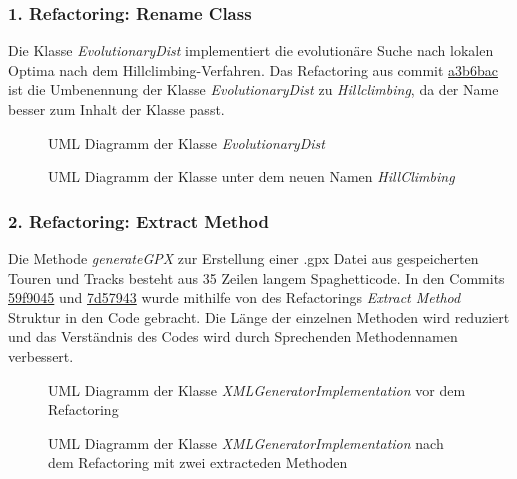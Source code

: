 \subsubsection{1. Refactoring: Rename Class}

Die Klasse \textit{EvolutionaryDist} implementiert die evolutionäre Suche nach lokalen Optima nach dem Hillclimbing-Verfahren.
Das Refactoring aus commit \href{https://github.com/reichert-p/GPXrechner/commit/7947597903210e73647ffbc20d07e6b5b257cff2\#diff-a3b6bacc77a02d2a1746cbbbd776a467bf3fcd7920bfefbef1e892af10172e50 }{a3b6bac} ist die Umbenennung der Klasse \textit{EvolutionaryDist} zu \textit{Hillclimbing}, da der Name besser zum Inhalt der Klasse passt.

\begin{figure}[H]
  \centering
  
  \caption{UML Diagramm der Klasse \textit{EvolutionaryDist}}
\end{figure}

\begin{figure}[H]
  \centering
  
  \caption{UML Diagramm der Klasse unter dem neuen Namen \textit{HillClimbing}}
\end{figure}

\subsubsection{2. Refactoring: Extract Method}

Die Methode \textit{generateGPX} zur Erstellung einer .gpx Datei aus gespeicherten Touren und Tracks besteht aus 35 Zeilen langem Spaghetticode. 
In den Commits 
\href{https://github.com/reichert-p/GPXrechner/commit/59f9045a2ac73496111bba87c35016c2b26108e2}{59f9045}
und 
\href{https://github.com/reichert-p/GPXrechner/commit/7d57943bb5fcdf2d23e76f05c0157f7753f6c05e}{7d57943} 
wurde mithilfe von des Refactorings \textit{Extract Method} Struktur in den Code gebracht. Die Länge der einzelnen Methoden wird reduziert und das Verständnis des Codes wird durch Sprechenden Methodennamen verbessert.

\begin{figure}[H]
  \centering
  
  \caption{UML Diagramm der Klasse \textit{XMLGeneratorImplementation} vor dem Refactoring}
\end{figure}

\begin{figure}[H]
  \centering
  
  \caption{UML Diagramm der Klasse \textit{XMLGeneratorImplementation} nach dem Refactoring mit zwei extracteden Methoden}
\end{figure}